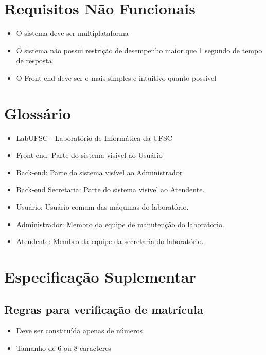 \documentclass[brazil,times]{abnt}
\begin{document}
\chapter{Requisitos Não Funcionais}
\begin{itemize}
  \item O sistema deve ser multiplataforma
  \item O sistema não possui restrição de desempenho maior que 1 segundo de
  tempo de resposta
  \item O Front-end deve ser o mais simples e intuitivo quanto possível
\end{itemize}

\chapter{Glossário}
\begin{itemize}
  \item LabUFSC - Laboratório de Informática da UFSC
  \item Front-end: Parte do sistema visível ao Usuário
  \item Back-end: Parte do sistema visível ao Administrador
  \item Back-end Secretaria: Parte do sistema visível ao Atendente.
  \item Usuário: Usuário comum das máquinas do laboratório.
  \item Administrador: Membro da equipe de manutenção do laboratório.
  \item Atendente: Membro da equipe da secretaria do laboratório.
\end{itemize}

\chapter{Especificação Suplementar}
\section{Regras para verificação de matrícula}
\begin{itemize}
  \item Deve ser constituída apenas de números
  \item Tamanho de 6 ou 8 caracteres
\end{itemize}

%
%
\end{document}
